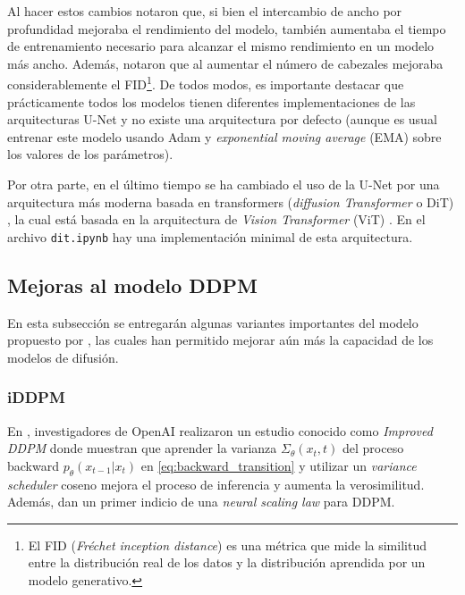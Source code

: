 
Al hacer estos cambios notaron que, si bien el intercambio de ancho por profundidad mejoraba el rendimiento del modelo, también aumentaba el tiempo de entrenamiento necesario para alcanzar el mismo rendimiento en un modelo más ancho. Además, notaron que al aumentar el número de cabezales mejoraba considerablemente el FID\footnote{El FID (\textit{Fréchet inception distance}) es una métrica que mide la similitud entre la distribución real de los datos y la distribución aprendida por un modelo generativo.}. De todos modos, es importante destacar que prácticamente todos los modelos tienen diferentes implementaciones de las arquitecturas U-Net y no existe una arquitectura por defecto (aunque es usual entrenar este modelo usando Adam y \textit{exponential moving average} (EMA) sobre los valores de los parámetros).

Por otra parte, en el último tiempo se ha cambiado el uso de la U-Net por una arquitectura más moderna basada en transformers (\textit{diffusion Transformer} o DiT) \cite{peebles2023scalablediffusionmodelstransformers}, la cual está basada en la arquitectura de \textit{Vision Transformer} (ViT) \cite{dosovitskiy2021image}. En el archivo \texttt{dit.ipynb} hay una implementación minimal de esta arquitectura.

\subsection{Mejoras al modelo DDPM}
\label{dm/discrete_dm/improvements}

En esta subsección se entregarán algunas variantes importantes del modelo propuesto por \cite{ho2020denoising}, las cuales han permitido mejorar aún más la capacidad de los modelos de difusión.

\subsubsection{iDDPM}

En \cite{nichol2021improved}, investigadores de OpenAI realizaron un estudio conocido como \textit{Improved DDPM} donde muestran que aprender la varianza $\Sigma_\theta(x_t,t)$ del proceso backward $p_\theta(x_{t-1}|x_t)$ en \eqref{eq:backward_transition} y utilizar un \textit{variance scheduler} coseno mejora el proceso de inferencia y aumenta la verosimilitud. Además, dan un primer indicio de una \textit{neural scaling law} para DDPM.

